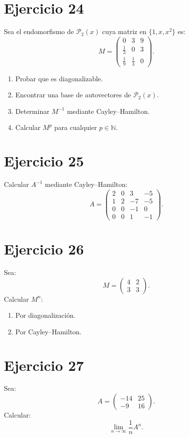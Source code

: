 \documentclass[11pt,a4paper]{article}
\begin{document}
\section{Ejercicio 24}
Sea el endomorfismo de $\mathcal P_2(x)$ cuya matriz en $\{1,x,x^2\}$ es:
\[
M=
\begin{pmatrix}
0&3&9\\
\frac13&0&3\\
\frac19&\frac13&0
\end{pmatrix}.
\]
\begin{enumerate}[label=\alph*)]
\item Probar que es diagonalizable.
\item Encontrar una base de autovectores de $\mathcal P_2(x)$.
\item Determinar $M^{-1}$ mediante Cayley--Hamilton.
\item Calcular $M^p$ para cualquier $p\in\mathbb N$.
\end{enumerate}

\section{Ejercicio 25}
Calcular $A^{-1}$ mediante Cayley--Hamilton:
\[
A=
\begin{pmatrix}
2&0&3&-5\\
1&2&-7&-5\\
0&0&-1&0\\
0&0&1&-1
\end{pmatrix}.
\]

\section{Ejercicio 26}
Sea:
\[
M=
\begin{pmatrix}
4&2\\
3&3
\end{pmatrix}.
\]
Calcular $M^n$:
\begin{enumerate}[label=\alph*)]
\item Por diagonalización.
\item Por Cayley--Hamilton.
\end{enumerate}

\section{Ejercicio 27}
Sea:
\[
A=
\begin{pmatrix}
-14&25\\
-9&16
\end{pmatrix}.
\]
Calcular:
\[
\lim_{n\to\infty}\frac1nA^n.
\]
\end{document}
